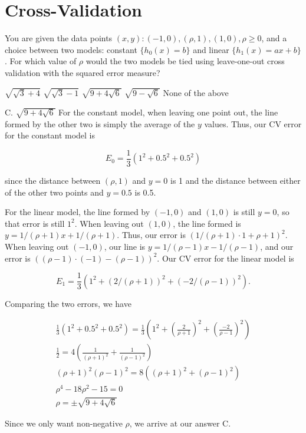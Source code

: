 \documentclass[answers]{exam}
\begin{document}
\section*{\textbf{Cross-Validation}}
\begin{questions}
\setcounter{question}{6}
\question You are given the data points $(x,y): (-1, 0), (\rho, 1), (1, 0), 
\rho \ge 0$, and a choice between two models: constant $\{h_0(x) = b\}$ and
linear $\{h_1(x) = ax+b\}$. For which value of $\rho$ would the two models 
be tied using leave-one-out cross validation with the squared error measure?

\begin{choices}
\choice $\sqrt{\sqrt{3} + 4}$
\choice $\sqrt{\sqrt{3} -1}$ 
\choice $\sqrt{9 + 4\sqrt{6}}$
\choice $\sqrt{9 - \sqrt{6}}$ 
\choice None of the above
\end{choices}

\begin{solution}
C. $\sqrt{9 + 4\sqrt{6}}$
For the constant model, when leaving one point out, the line formed by the
other two is simply the average of the $y$ values. Thus, our CV error for the
constant model is

\[
E_0 = \frac{1}{3}(1^2 + 0.5^2 + 0.5^2)
\] 

since the distance between $(\rho, 1)$ and $y=0$ is 1 and the distance between 
either of the other two points and $y=0.5$ is 0.5.

For the linear model, the line formed by $(-1,0)$ and $(1,0)$ is still $y=0$,
so that error is still $1^2$. When leaving out $(1,0)$, the line formed is
$y = 1/(\rho + 1) x + 1 /(\rho + 1)$. Thus, our error is $(1 /(\rho + 1) \cdot 1 
+ \rho + 1)^2$. When leaving out $(-1, 0)$, our line is $y = 1 / (\rho - 1)x - 1 
/ (\rho - 1)$, and our error is $((\rho - 1) \cdot (-1) - (\rho - 1))^2$. Our 
CV error for the linear model is

\[
E_1 = \frac{1}{3}(1^2 + (2 / (\rho + 1))^2 + (-2 / (\rho - 1))^2)
.\] 

Comparing the two errors, we have

\begin{gather*}
\frac{1}{3}(1^2 + 0.5^2 + 0.5^2) = \frac{1}{3}(1^2 + \left(\frac{2}{\rho + 1}\right)^2 + \left(\frac{-2}{\rho - 1}\right)^2) \\ 
\frac{1}{2} = 4\left( \frac{1}{(\rho + 1)^2} + \frac{1}{(\rho - 1)^2} \right)  \\ 
(\rho + 1)^2(\rho - 1)^2 = 8((\rho + 1)^2 + (\rho - 1)^2) \\ 
\rho^{4} - 18\rho^2 - 15 = 0 \\ 
\rho = \pm \sqrt{9 + 4\sqrt{6}}
\end{gather*}

Since we only want non-negative $\rho$, we arrive at our answer C.
\end{solution}
\end{questions}
\end{document}
